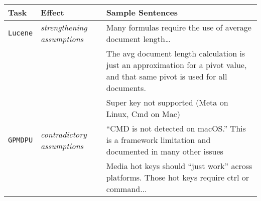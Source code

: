 
\begin{table}
\caption{}
\label{tbl:assumptions}
\centering    
\begin{footnotesize}
\begin{threeparttable}
\begin{tabular}{lll}




\textbf{Task} & \textbf{Effect} &  \textbf{Sample Sentences} \\

\hline



\texttt{Lucene} & \parbox[l][1.0cm][c] {2cm}{\textit{strengthening assumptions}} &
\parbox[l][1.0cm][c] {8cm}{
    Many formulas require the use of average document length\dots
}
\\

\texttt{} & \parbox[l][1.0cm][c] {2cm}{} &
\parbox[l][1.0cm][c] {8cm}{
    The avg document length calculation is just an approximation for a pivot value, and that same pivot is used for all documents. 
}
\\

\hline


\texttt{} & \parbox[l][1.0cm][c] {2cm}{} &
\parbox[l][1.0cm][c] {8cm}{
    Super key not supported (Meta on Linux, Cmd on Mac)
}
\\

\texttt{GPMDPU} & \parbox[l][1.0cm][c] {2cm}{\textit{contradictory assumptions}} &
\parbox[l][1.0cm][c] {8cm}{
    ``CMD is not detected on macOS.'' This is a framework limitation and documented in many other issues
}
\\

\texttt{} & \parbox[l][1.0cm][c] {1.7cm}{} &
\parbox[l][1.0cm][c] {8cm}{
    Media hot keys should ``just work'' across platforms. Those hot keys require ctrl or command...
}
\\


\hline


\end{tabular}
\end{threeparttable}
\end{footnotesize}
\end{table}

